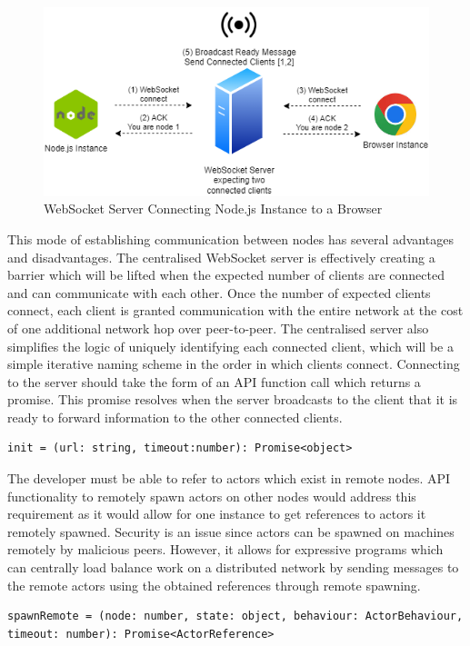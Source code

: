 \documentclass[oneside]{um-fict}
\begin{document}
\begin{figure}[H]
    \begin{centering}
        \includegraphics[width=\textwidth]{resources/websocketconnection.png}
        \caption{WebSocket Server Connecting Node.js Instance to a Browser}\label{fig:websocketconnection}
    \end{centering}
\end{figure}
 
This mode of establishing communication between nodes has several advantages and disadvantages. The centralised WebSocket server is effectively creating a barrier which will be lifted when the expected number of clients are connected and can communicate with each other. Once the number of expected clients connect, each client is granted communication with the entire network at the cost of one additional network hop over peer-to-peer. The centralised server also simplifies the logic of uniquely identifying each connected client, which will be a simple iterative naming scheme in the order in which clients connect. Connecting to the server should take the form of an API function call which returns a promise. This promise resolves when the server broadcasts to the client that it is ready to forward information to the other connected clients.
\begin{lstlisting}
init = (url: string, timeout:number): Promise<object>
\end{lstlisting}
The developer must be able to refer to actors which exist in remote nodes. API functionality to remotely spawn actors on other nodes would address this requirement as it would allow for one instance to get references to actors it remotely spawned. Security is an issue since actors can be spawned on machines remotely by malicious peers. However, it allows for expressive programs which can centrally load balance work on a distributed network by sending messages to the remote actors using the obtained references through remote spawning.
\begin{lstlisting}
spawnRemote = (node: number, state: object, behaviour: ActorBehaviour, timeout: number): Promise<ActorReference>
\end{lstlisting}
\end{document}
